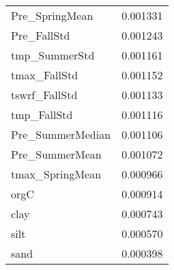 \begin{tabular}{lr}
Pre_SpringMean & 0.001331 \\
Pre_FallStd & 0.001243 \\
tmp_SummerStd & 0.001161 \\
tmax_FallStd & 0.001152 \\
tswrf_FallStd & 0.001133 \\
tmp_FallStd & 0.001116 \\
Pre_SummerMedian & 0.001106 \\
Pre_SummerMean & 0.001072 \\
tmax_SpringMean & 0.000966 \\
orgC & 0.000914 \\
clay & 0.000743 \\
silt & 0.000570 \\
sand & 0.000398 \\
\bottomrule
\end{tabular}
